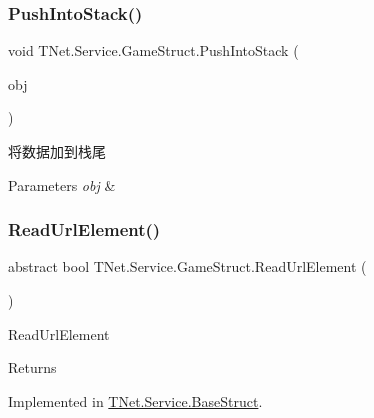 \subsubsection{\texorpdfstring{Push\+Into\+Stack()}{PushIntoStack()}\hspace{0.1cm}{\footnotesize\ttfamily [15/15]}}
{\footnotesize\ttfamily void T\+Net.\+Service.\+Game\+Struct.\+Push\+Into\+Stack (\begin{DoxyParamCaption}\item[{\mbox{\hyperlink{class_t_net_1_1_service_1_1_data_struct}{Data\+Struct}}}]{obj }\end{DoxyParamCaption})}



将数据加到栈尾 


\begin{DoxyParams}{Parameters}
{\em obj} & \\
\hline
\end{DoxyParams}
\mbox{\label{class_t_net_1_1_service_1_1_game_struct_ab30ab74b0856742fd3da24539b94fb13}} 
\subsubsection{\texorpdfstring{Read\+Url\+Element()}{ReadUrlElement()}}
{\footnotesize\ttfamily abstract bool T\+Net.\+Service.\+Game\+Struct.\+Read\+Url\+Element (\begin{DoxyParamCaption}{ }\end{DoxyParamCaption})\hspace{0.3cm}{\ttfamily [pure virtual]}}



Read\+Url\+Element 

\begin{DoxyReturn}{Returns}

\end{DoxyReturn}


Implemented in \mbox{\hyperlink{class_t_net_1_1_service_1_1_base_struct_afa4a4e036ed31b2f0d2eba3b2ed8a99c}{T\+Net.\+Service.\+Base\+Struct}}.

\mbox{\label{class_t_net_1_1_service_1_1_game_struct_aff61ff71c1dd0a5ffef06af3f80f79ca}} 
